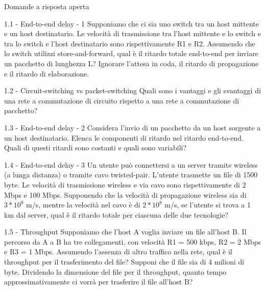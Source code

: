 \documentclass[a4paper]{article}
\begin{document}
\begin{quiz}{Domande a risposta aperta}


\begin{essay}[points=1]{1.1 - End-to-end delay - 1}
Supponiamo che ci sia uno switch tra un host mittente e un host destinatario. Le velocità di trasmissione tra l'host mittente e lo switch e tra lo switch e l'host destinatario sono rispettivamente R1 e R2. Assumendo che lo switch utilizzi store-and-forward, qual è il ritardo totale end-to-end per inviare un pacchetto di lunghezza L? Ignorare l'attesa in coda, il ritardo di propagazione e il ritardo di elaborazione.
\end{essay}

\begin{essay}[points=1]{1.2 - Circuit-switching vs packet-switching}
Quali sono i vantaggi e gli svantaggi di una rete a commutazione di circuito rispetto a una rete a commutazione di pacchetto?
\end{essay}

\begin{essay}[points=1]{1.3 - End-to-end delay - 2}
Considera l'invio di un pacchetto da un host sorgente a un host destinatario. Elenca le componenti di ritardo nel ritardo end-to-end. Quali di questi ritardi sono costanti e quali sono variabili?
\end{essay}

\begin{essay}[points=1]{1.4 - End-to-end delay - 3}
Un utente può connettersi a un server tramite wireless (a lunga distanza) o tramite cavo twisted-pair. L'utente trasmette un file di 1500 byte. Le velocità di trasmissione wireless e via cavo sono rispettivamente di 2 Mbps e 100 Mbps. Supponendo che la velocità di propagazione wireless sia di $3*10^8$ m/s, mentre la velocità nel cavo è di $2*10^8$ m/s, se l'utente si trova a 1 km dal server, qual è il ritardo totale per ciascuna delle due tecnologie?
\end{essay}

\begin{essay}[points=1]{1.5 - Throughput}
Supponiamo che l'host A voglia inviare un file all'host B. Il percorso da A a B ha tre collegamenti, con velocità R1 = 500 kbps, R2 = 2 Mbps e R3 = 1 Mbps. Assumendo l'assenza di altro traffico nella rete, qual è il throughput per il trasferimento del file? Supponi che il file sia di 4 milioni di byte. Dividendo la dimensione del file per il throughput, quanto tempo approssimativamente ci vorrà per trasferire il file all'host B?
\end{essay}


\end{quiz}
\end{document}

